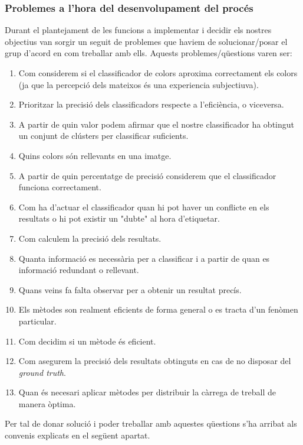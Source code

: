 \documentclass[a4paper, 11pt]{article}
\begin{document}
\subsubsection{Problemes a l'hora del desenvolupament del procés}
Durant el plantejament de les funcions a implementar i decidir els nostres objectius van sorgir un seguit de problemes que haviem de solucionar/posar el grup d'acord en com treballar amb ells. Aquests problemes/qüestions varen ser:
\begin{enumerate}
    \item Com considerem si el classificador de colors aproxima correctament els colors (ja que la percepció dels mateixos és una experiencia subjectiuva).
    \item Prioritzar la precisió dels classificadors respecte a l'eficiència, o viceversa.
    \item A partir de quin valor podem afirmar que el nostre classificador ha obtingut un conjunt de clústers per classificar suficients.
    \item Quins colors són rellevants en una imatge.
    \item A partir de quin percentatge de precisió considerem que el classificador funciona correctament.
    \item Com ha d'actuar el classificador quan hi pot haver un conflicte en els resultats o hi pot existir un "dubte"\hspace{0.0625em} al hora d'etiquetar.
    \item Com calculem la precisió dels resultats.
    \item Quanta informació es necessària per a classificar i a partir de quan es informació redundant o rellevant.
    \item Quans veins fa falta observar per a obtenir un resultat precís.
    \item Els mètodes son realment eficients de forma general o es tracta d'un fenòmen particular.
    \item Com decidim si un mètode és eficient.
    \item Com asegurem la precisió dels resultats obtinguts en cas de no disposar del \textit{ground truth}.
    \item Quan és necesari aplicar mètodes per distribuir la càrrega de treball de manera òptima.
\end{enumerate}
Per tal de donar solució i poder treballar amb aquestes qüestions s'ha arribat als convenis explicats en el següent apartat.

\newpage
\end{document}

